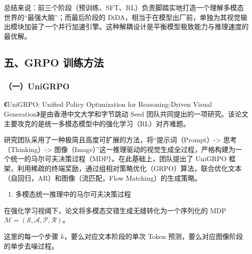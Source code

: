 总结来说：前三个阶段（预训练、SFT、RL）负责脚踏实地打造一个理解多模态世界的``最强大脑''；而最后阶段的 DiDA，相当于在模型出厂前，单独为其视觉输出模块加装了一个并行加速引擎。这种解耦设计是平衡模型极致能力与推理速度的最优解。

\hypertarget{ux4e94grpo-ux8badux7ec3ux65b9ux6cd5}{%
\subsection{五、GRPO 训练方法}\label{ux4e94grpo-ux8badux7ec3ux65b9ux6cd5}}

\hypertarget{ux4e00unigrpo}{%
\subsubsection{（一）UniGRPO}\label{ux4e00unigrpo}}

《UniGRPO: Unified Policy Optimization for Reasoning-Driven Visual Generation》是由香港中文大学和字节跳动 Seed 团队共同提出的一项研究。该论文主要攻克的是统一多模态模型中的强化学习（RL）对齐难题。

研究团队采用了一种极简且高度可扩展的方法，将``提示词（Prompt）-\textgreater{} 思考（Thinking）-\textgreater{} 图像（Image）''这一推理驱动的视觉生成全过程，严格构建为一个统一的马尔可夫决策过程（MDP）。在此基础上，团队提出了 UniGRPO 框架，利用稀疏的终端奖励，通过组相对策略优化（GRPO）算法，联合优化文本（自回归，AR）和图像（流匹配，Flow Matching）的生成策略。

\begin{enumerate}
\def\labelenumi{\arabic{enumi}.}
\tightlist
\item
  多模态统一推理中的马尔可夫决策过程
\end{enumerate}

在强化学习视阈下，论文将多模态交错生成无缝转化为一个序列化的 MDP \(\mathcal{M}=(\mathcal{S},\mathcal{A},\mathcal{P},\mathcal{R})\)。

这里的每一个步骤 \(k\)，要么对应文本阶段的单次 Token 预测，要么对应图像阶段的单步去噪过程。

